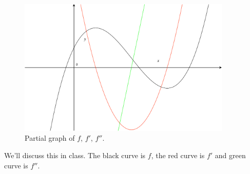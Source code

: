 \documentclass[12pt,addpoints, answers, fleqn]{exam}
\begin{document}
\begin{questions}
\begin{figure}[htbp] %
   \centering
   \includegraphics[width=4in]{./graphics/graph1301.pdf} 
   \caption{Partial graph of $f$, $f'$, $f''$.}
   \label{fig:graph1301}
\end{figure}

\begin{solution}
We'll discuss this in class.
The black curve is $f$, the red curve is $f'$ and green curve is $f''$.
\end{solution}

\end{questions}
\end{document}
